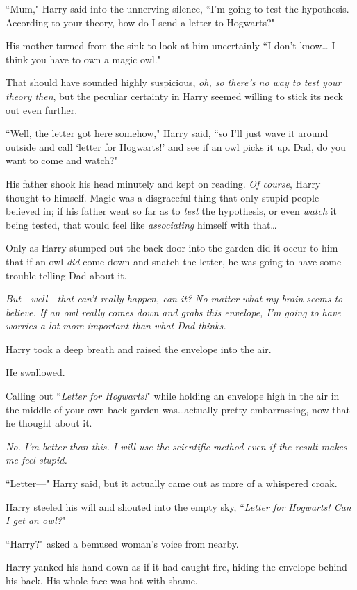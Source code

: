 ``Mum," Harry said into the unnerving silence, ``I'm going to test the hypothesis. According to your theory, how do I send a letter to Hogwarts?"

His mother turned from the sink to look at him uncertainly ``I don't know{\ldots} I think you have to own a magic owl."

That should have sounded highly suspicious, \emph{oh, so there's no way to test your theory then}, but the peculiar certainty in Harry seemed willing to stick its neck out even further.

``Well, the letter got here somehow," Harry said, ``so I'll just wave it around outside and call `letter for Hogwarts!' and see if an owl picks it up. Dad, do you want to come and watch?"

His father shook his head minutely and kept on reading. \emph{Of course}, Harry thought to himself. Magic was a disgraceful thing that only stupid people believed in; if his father went so far as to \emph{test} the hypothesis, or even \emph{watch} it being tested, that would feel like \emph{associating} himself with that{\ldots}

Only as Harry stumped out the back door into the garden did it occur to him that if an owl \emph{did} come down and snatch the letter, he was going to have some trouble telling Dad about it.

\emph{But---well---that can't \emph{really} happen, can it? No matter what my brain seems to believe. If an owl really comes down and grabs this envelope, I'm going to have worries a lot more important than what Dad thinks.}

Harry took a deep breath and raised the envelope into the air.

He swallowed.

Calling out ``\emph{Letter for Hogwarts!}" while holding an envelope high in the air in the middle of your own back garden was{\ldots}actually pretty embarrassing, now that he thought about it.

\emph{No. I'm better than this. I will use the scientific method even if the result makes me feel stupid.}

``Letter---" Harry said, but it actually came out as more of a whispered croak.

Harry steeled his will and shouted into the empty sky, ``\emph{Letter for Hogwarts! Can I get an owl?}"

``Harry?" asked a bemused woman's voice from nearby.

Harry yanked his hand down as if it had caught fire,
hiding the envelope behind his back. His whole face was hot with shame.

